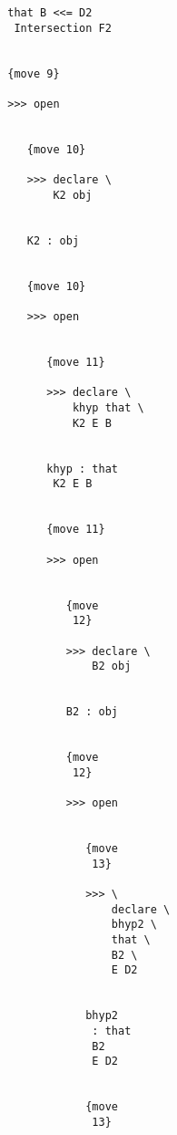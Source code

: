 \documentclass[12pt]{article}
\begin{document}
\begin{verbatim}
                           that B <<= D2 
                            Intersection F2


                           {move 9}

                           >>> open


                              {move 10}

                              >>> declare \
                                  K2 obj


                              K2 : obj


                              {move 10}

                              >>> open


                                 {move 11}

                                 >>> declare \
                                     khyp that \
                                     K2 E B


                                 khyp : that 
                                  K2 E B


                                 {move 11}

                                 >>> open


                                    {move 
                                     12}

                                    >>> declare \
                                        B2 obj


                                    B2 : obj


                                    {move 
                                     12}

                                    >>> open


                                       {move 
                                        13}

                                       >>> \
                                           declare \
                                           bhyp2 \
                                           that \
                                           B2 \
                                           E D2


                                       bhyp2 
                                        : that 
                                        B2 
                                        E D2


                                       {move 
                                        13}


\end{verbatim}
\end{document}
